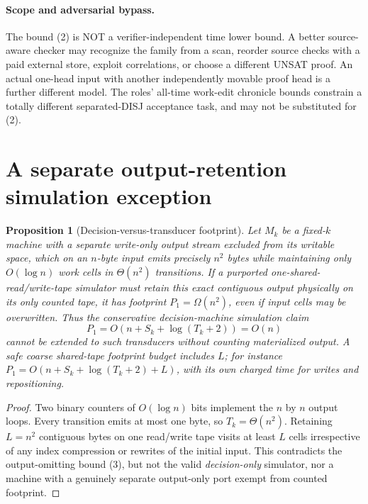 \documentclass[11pt]{article}
\newtheorem{proposition}[theorem]{Proposition}
\begin{document}
\paragraph{Scope and adversarial bypass.} The bound (2) is NOT a verifier-independent time lower bound. A better source-aware checker may recognize the family from a scan, reorder source checks with a paid external store, exploit correlations, or choose a different UNSAT proof. An actual one-head input with another independently movable proof head is a further different model. The roles' all-time work-edit chronicle bounds constrain a totally different separated-DISJ acceptance task, and may not be substituted for (2).

\section{A separate output-retention simulation exception}
\begin{proposition}[Decision-versus-transducer footprint]
Let $M_k$ be a fixed-$k$ machine with a separate \emph{write-only} output stream excluded from its writable space, which on an $n$-byte input emits precisely $n^2$ bytes while maintaining only $O(\log n)$ work cells in $\Theta(n^2)$ transitions. If a purported one-shared-read/write-tape simulator must retain this exact contiguous output physically on its only counted tape, it has footprint $P_1=\Omega(n^2)$, even if input cells may be overwritten. Thus the conservative decision-machine simulation claim
\[
P_1=O(n+S_k+\log(T_k+2))=O(n)
\tag{3}
\]
\emph{cannot} be extended to such transducers without counting materialized output. A safe coarse shared-tape footprint budget includes $L$; for instance $P_1=O(n+S_k+\log(T_k+2)+L)$, with its own charged time for writes and repositioning.
\end{proposition}
\begin{proof}
Two binary counters of $O(\log n)$ bits implement the $n$ by $n$ output loops. Every transition emits at most one byte, so $T_k=\Theta(n^2)$. Retaining $L=n^2$ contiguous bytes on one read/write tape visits at least $L$ cells irrespective of any index compression or rewrites of the initial input. This contradicts the output-omitting bound (3), but not the valid \emph{decision-only} simulator, nor a machine with a genuinely separate output-only port exempt from counted footprint.\end{proof}
\end{document}
